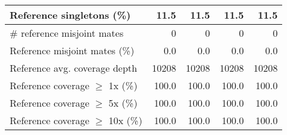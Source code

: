 \documentclass[12pt,a4paper]{article}
\begin{document}
\begin{table}[ht]
\begin{center}
\begin{tabular}{|l*{4}{|r}|}
Reference singletons (\%) & 11.5 & 11.5 & 11.5 & 11.5 \\ \hline
\# reference misjoint mates & 0 & 0 & 0 & 0 \\ \hline
Reference misjoint mates (\%) & 0.0 & 0.0 & 0.0 & 0.0 \\ \hline
Reference avg. coverage depth & 10208 & 10208 & 10208 & 10208 \\ \hline
Reference coverage $\geq$ 1x (\%) & 100.0 & 100.0 & 100.0 & 100.0 \\ \hline
Reference coverage $\geq$ 5x (\%) & 100.0 & 100.0 & 100.0 & 100.0 \\ \hline
Reference coverage $\geq$ 10x (\%) & 100.0 & 100.0 & 100.0 & 100.0 \\ \hline
\end{tabular}
\end{center}
\end{table}
\end{document}
